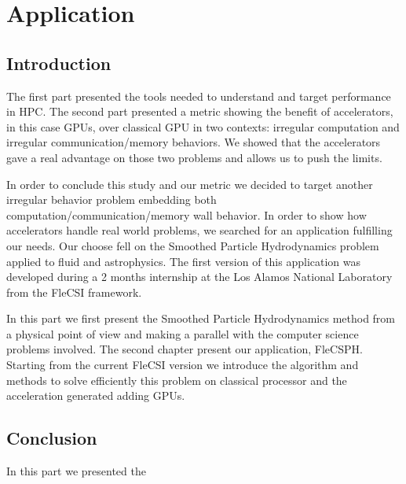 \part{Application}

\chapter*{Introduction}
The first part presented the tools needed to understand and target performance in HPC. 
The second part presented a metric showing the benefit of accelerators, in this case GPUs, over classical GPU in two contexts: irregular computation and irregular communication/memory behaviors.
We showed that the accelerators gave a real advantage on those two problems and allows us to push the limits.

In order to conclude this study and our metric we decided to target another irregular behavior problem embedding both computation/communication/memory wall behavior. 
In order to show how accelerators handle real world problems, we searched for an application fulfilling our needs. 
Our choose fell on the Smoothed Particle Hydrodynamics problem applied to fluid and astrophysics. 
The first version of this application was developed during a 2 months internship at the Los Alamos National Laboratory from the FleCSI framework.

In this part we first present the Smoothed Particle Hydrodynamics method from a physical point of view and making a parallel with the computer science problems involved. 
The second chapter present our application, FleCSPH. 
Starting from the current FleCSI version we introduce the algorithm and methods to solve efficiently this problem on classical processor and the acceleration generated adding GPUs. 







\chapter*{Conclusion}
In this part we presented the 
